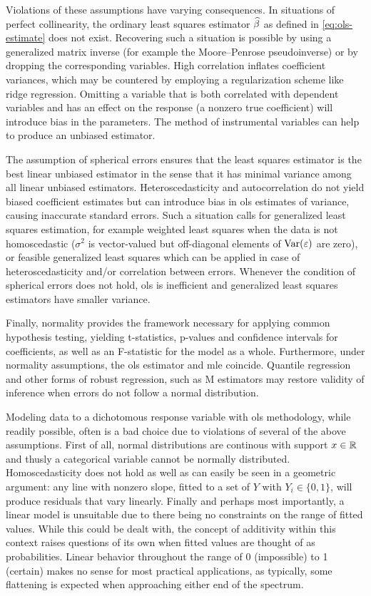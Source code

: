Violations of these assumptions have varying consequences. In situations of perfect collinearity, the ordinary least squares estimator $\widehat{\beta}$ as defined in \eqref{eq:ols-estimate} does not exist. Recovering such a situation is possible by using a generalized matrix inverse (for example the Moore--Penrose pseudoinverse) or by dropping the corresponding variables. High correlation inflates coefficient variances, which may be countered by employing a regularization scheme like ridge regression. Omitting a variable that is both correlated with dependent variables and has an effect on the response (a nonzero true coefficient) will introduce bias in the parameters. The method of instrumental variables can help to produce an unbiased estimator.

The assumption of spherical errors ensures that the least squares estimator is the best linear unbiased estimator in the sense that it has minimal variance among all linear unbiased estimators. Heteroscedasticity and autocorrelation do not yield biased coefficient estimates but can introduce bias in \gls{ols} estimates of variance, causing inaccurate standard errors. Such a situation calls for generalized least squares estimation, for example weighted least squares when the data is not homoscedastic ($\sigma^2$ is vector-valued but off-diagonal elements of $\operatorname{Var}(\varepsilon)$ are zero), or feasible generalized least squares which can be applied in case of heteroscedasticity and\slash or correlation between errors. Whenever the condition of spherical errors does not hold, \gls{ols} is inefficient and generalized least squares estimators have smaller variance.

Finally, normality provides the framework necessary for applying common hypothesis testing, yielding t-statistics, p-values and confidence intervals for coefficients, as well as an F-statistic for the model as a whole. Furthermore, under normality assumptions, the \gls{ols} estimator and \gls{mle} coincide. Quantile regression and other forms of robust regression, such as M estimators may restore validity of inference when errors do not follow a normal distribution.

Modeling data to a dichotomous response variable with \gls{ols} methodology, while readily possible, often is a bad choice due to violations of several of the above assumptions. First of all, normal distributions are continous with support $x \in \mathbb{R}$ and thusly a categorical variable cannot be normally distributed. Homoscedasticity does not hold as well as can easily be seen in a geometric argument: any line with nonzero slope, fitted to a set of $Y$ with $Y_i \in \{0,1\}$, will produce residuals that vary linearly. Finally and perhaps most importantly, a linear model is unsuitable due to there being no constraints on the range of fitted values. While this could be dealt with, the concept of additivity within this context raises questions of its own when fitted values are thought of as probabilities. Linear behavior throughout the range of 0 (impossible) to 1 (certain) makes no sense for most practical applications, as typically, some flattening is expected when approaching either end of the spectrum.

